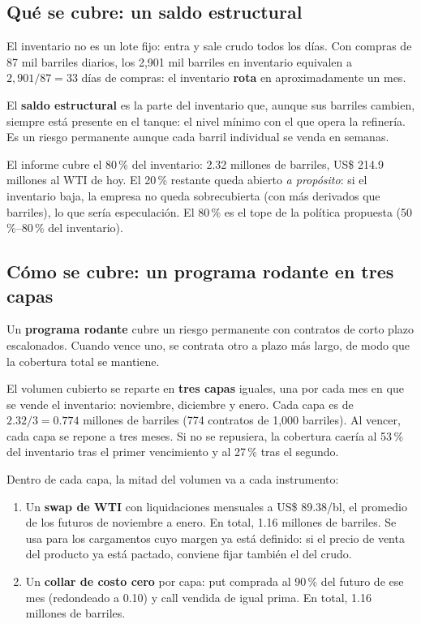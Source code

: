 \subsection{Qué se cubre: un saldo estructural}

El inventario no es un lote fijo: entra y sale crudo todos los días. Con compras de 87 mil barriles diarios, los 2,901 mil barriles en inventario equivalen a $2{,}901/87=33$ días de compras: el inventario \textbf{rota} en aproximadamente un mes.

\begin{definicion}
El \textbf{saldo estructural} es la parte del inventario que, aunque sus barriles cambien, siempre está presente en el tanque: el nivel mínimo con el que opera la refinería. Es un riesgo permanente aunque cada barril individual se venda en semanas.
\end{definicion}

El informe cubre el 80\,\% del inventario: 2.32 millones de barriles, US\$ 214.9 millones al WTI de hoy. El 20\,\% restante queda abierto \emph{a propósito}: si el inventario baja, la empresa no queda sobrecubierta (con más derivados que barriles), lo que sería especulación. El 80\,\% es el tope de la política propuesta (50\,\%--80\,\% del inventario).

\subsection{Cómo se cubre: un programa rodante en tres capas}

\begin{definicion}
Un \textbf{programa rodante} cubre un riesgo permanente con contratos de corto plazo escalonados. Cuando vence uno, se contrata otro a plazo más largo, de modo que la cobertura total se mantiene.
\end{definicion}

El volumen cubierto se reparte en \textbf{tres capas} iguales, una por cada mes en que se vende el inventario: noviembre, diciembre y enero. Cada capa es de $2.32/3=0.774$ millones de barriles (774 contratos de 1,000 barriles). Al vencer, cada capa se repone a tres meses. Si no se repusiera, la cobertura caería al 53\,\% del inventario tras el primer vencimiento y al 27\,\% tras el segundo.

Dentro de cada capa, la mitad del volumen va a cada instrumento:
\begin{enumerate}
\item[(a)] Un \textbf{swap de WTI} con liquidaciones mensuales a US\$ 89.38/bl, el promedio de los futuros de noviembre a enero. En total, 1.16 millones de barriles. Se usa para los cargamentos cuyo margen ya está definido: si el precio de venta del producto ya está pactado, conviene fijar también el del crudo.
\item[(b)] Un \textbf{collar de costo cero} por capa: put comprada al 90\,\% del futuro de ese mes (redondeado a 0.10) y call vendida de igual prima. En total, 1.16 millones de barriles.
\end{enumerate}

